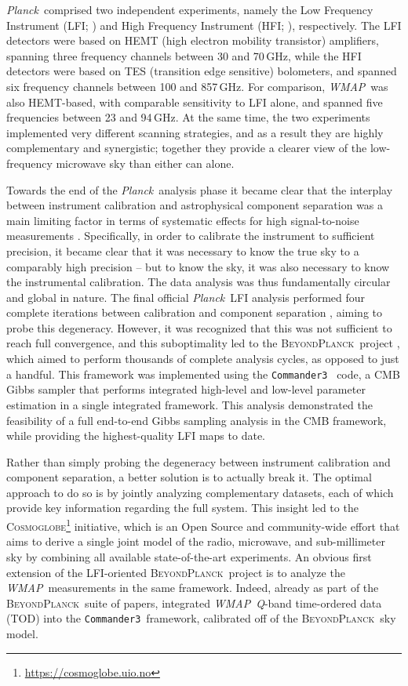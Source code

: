 \documentclass[twocolumn]{../../common/aa}
\def\WMAP{\emph{WMAP}}
\def\Planck{\emph{Planck}}
\def\commanderthree{\texttt{Commander3}}
\newcommand{\BP}{\textsc{BeyondPlanck}}
\newcommand{\cosmoglobe}{\textsc{Cosmoglobe}}
\newcommand{\Q}[0]{\textit Q}
\begin{document}
\Planck\ comprised two independent experiments, namely the Low Frequency Instrument (LFI; \citealp{planck2016-l02}) and High Frequency Instrument (HFI; \citealp{planck2016-l03}), respectively. The LFI detectors were based on HEMT (high electron mobility transistor) amplifiers, spanning three frequency channels between 30 and 70\,GHz, while the HFI detectors were based on TES (transition edge sensitive) bolometers, and spanned six frequency channels between 100 and 857\,GHz. For comparison, \WMAP\ was also HEMT-based, with comparable sensitivity to LFI alone, and spanned five frequencies between 23 and 94\,GHz. At the same time, the two experiments implemented very different scanning strategies, and as a result they are highly complementary and synergistic; together they provide a clearer view of the low-frequency microwave sky than either can alone.

Towards the end of the \Planck\ analysis phase it became clear that the interplay between instrument calibration and astrophysical component separation was a main limiting factor in terms of systematic effects for high signal-to-noise measurements \citep{planck2016-l02}. Specifically, in order to calibrate the instrument to sufficient precision, it became clear that it was necessary to know the true sky to a comparably high precision -- but to know the sky, it was also necessary to know the instrumental calibration. The data analysis was thus fundamentally circular and global in nature. The final official \Planck\ LFI analysis performed four complete iterations between calibration and component separation \citep{planck2016-l02}, aiming to probe this degeneracy. However, it was recognized that this was not sufficient to reach full convergence, and this suboptimality led to the \BP\ project \citep{bp01}, which aimed to perform thousands of complete analysis cycles, as opposed to just a handful. This framework was implemented using the \commanderthree\ \citep{bp03} code, a CMB Gibbs sampler that performs integrated high-level and low-level parameter estimation in a single integrated framework. This analysis demonstrated the feasibility of a full end-to-end Gibbs sampling analysis in the CMB framework, while providing the highest-quality LFI maps to date.

Rather than simply probing the degeneracy between instrument calibration and component separation, a better solution is to actually break it. The optimal approach to do so is by jointly analyzing complementary datasets, each of which provide key information regarding the full system. This insight led to the \cosmoglobe\footnote{\url{https://cosmoglobe.uio.no}} initiative, which is an Open Source and community-wide effort that aims to derive a single joint model of the radio, microwave, and sub-millimeter sky by combining all available state-of-the-art experiments. An obvious first extension of the LFI-oriented \BP\ project is to analyze the \WMAP\ measurements in the same framework. Indeed, already as part of the \BP\ suite of papers, \citet{bp17} integrated \WMAP\ \Q-band time-ordered data (TOD) into the \commanderthree\ framework, calibrated off of the \BP\ sky model.
\end{document}
